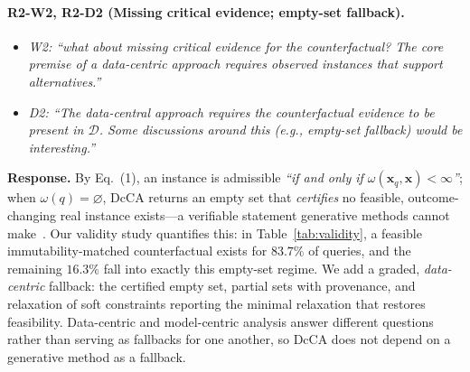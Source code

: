 \paragraph{R2-W2, R2-D2 (Missing critical evidence; empty-set fallback).}

\begin{itemize}[leftmargin=1.2em, itemsep=1pt, topsep=2pt]
\item \textit{W2: ``what about missing critical evidence for the counterfactual? The core premise of a data-centric approach requires observed instances that support alternatives.''}
\item \textit{D2: ``The data-central approach requires the counterfactual evidence to be present in $\mathcal{D}$. Some discussions around this (e.g., empty-set fallback) would be interesting.''}
\end{itemize}
\smallskip

\noindent\textbf{Response.}
By Eq.~(1), an instance is admissible \emph{``if and only if $\omega(\mathbf{x}_q,\mathbf{x})<\infty$''}; when $\omega(q)=\varnothing$, DcCA returns an empty set that \emph{certifies} no feasible, outcome-changing real instance exists---a verifiable statement generative methods cannot make~\cite{wachter2017counterfactual,mothilal2020explaining}. Our validity study quantifies this: in Table~\ref{tab:validity}, a feasible immutability-matched counterfactual exists for $83.7\%$ of queries, and the remaining $16.3\%$ fall into exactly this empty-set regime. We add a graded, \emph{data-centric} fallback: the certified empty set, partial sets with provenance, and relaxation of soft constraints reporting the minimal relaxation that restores feasibility. Data-centric and model-centric analysis answer different questions rather than serving as fallbacks for one another, so DcCA does not depend on a generative method as a fallback.

